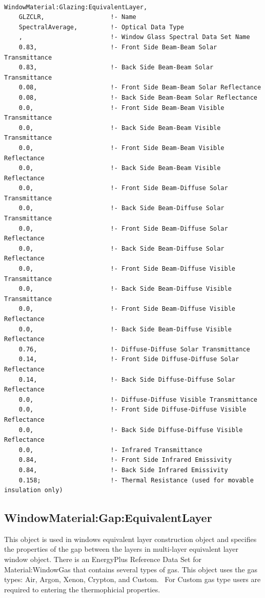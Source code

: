 \begin{lstlisting}

WindowMaterial:Glazing:EquivalentLayer,
    GLZCLR,                  !- Name
    SpectralAverage,         !- Optical Data Type
    ,                        !- Window Glass Spectral Data Set Name
    0.83,                    !- Front Side Beam-Beam Solar Transmittance
    0.83,                    !- Back Side Beam-Beam Solar Transmittance
    0.08,                    !- Front Side Beam-Beam Solar Reflectance
    0.08,                    !- Back Side Beam-Beam Solar Reflectance
    0.0,                     !- Front Side Beam-Beam Visible Transmittance
    0.0,                     !- Back Side Beam-Beam Visible Transmittance
    0.0,                     !- Front Side Beam-Beam Visible Reflectance
    0.0,                     !- Back Side Beam-Beam Visible Reflectance
    0.0,                     !- Front Side Beam-Diffuse Solar Transmittance
    0.0,                     !- Back Side Beam-Diffuse Solar Transmittance
    0.0,                     !- Front Side Beam-Diffuse Solar Reflectance
    0.0,                     !- Back Side Beam-Diffuse Solar Reflectance
    0.0,                     !- Front Side Beam-Diffuse Visible Transmittance
    0.0,                     !- Back Side Beam-Diffuse Visible Transmittance
    0.0,                     !- Front Side Beam-Diffuse Visible Reflectance
    0.0,                     !- Back Side Beam-Diffuse Visible Reflectance
    0.76,                    !- Diffuse-Diffuse Solar Transmittance
    0.14,                    !- Front Side Diffuse-Diffuse Solar Reflectance
    0.14,                    !- Back Side Diffuse-Diffuse Solar Reflectance
    0.0,                     !- Diffuse-Diffuse Visible Transmittance
    0.0,                     !- Front Side Diffuse-Diffuse Visible Reflectance
    0.0,                     !- Back Side Diffuse-Diffuse Visible Reflectance
    0.0,                     !- Infrared Transmittance
    0.84,                    !- Front Side Infrared Emissivity
    0.84,                    !- Back Side Infrared Emissivity
    0.158;                   !- Thermal Resistance (used for movable insulation only)
\end{lstlisting}

\subsection{WindowMaterial:Gap:EquivalentLayer}\label{windowmaterialgapequivalentlayer}

This object is used in windows equivalent layer construction object and specifies the properties of the gap between the layers in multi-layer equivalent layer window object. There is an EnergyPlus Reference Data Set for Material:WindowGas that contains several types of gas. This object uses the gas types: Air, Argon, Xenon, Crypton, and Custom.~ For Custom gas type users are required to entering the thermophicial properties.

